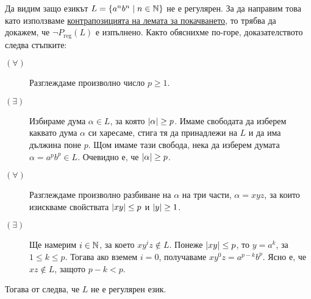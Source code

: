 \begin{example}\label{ex:regular:pumping:an-bn}
  Да видим защо езикът $L = \{a^nb^n \mid n\in \mathbb{N}\}$ не е регулярен.
  За да направим това като използваме \hyperref[cor:pumping-reg]{контрапозицията на лемата за покачването}, то трябва да докажем, че
  $\neg P_{\text{reg}}(L)$ е изпълнено.
  Както обяснихме по-горе, доказателството следва стъпките:
  \begin{description}
  \item[$(\forall)$]
    Разглеждаме произволно число $p \geq 1$.
  \item[$(\exists)$]
    Избираме дума $\alpha \in L$, за която $\lvert{\alpha}\rvert \geq p$. Имаме свободата да изберем каквато дума $\alpha$
    си харесаме, стига тя да принадлежи на $L$ и да има дължина поне $p$.
    Щом имаме тази свобода, нека да изберем думата $\alpha = a^pb^p \in L$.
    Очевидно е, че $\lvert{\alpha}\rvert \geq p$.
  \item[$(\forall)$]
    Разглеждаме произволно разбиване на $\alpha$ на три части, $\alpha = xyz$,
    за които изискваме свойствата $\lvert{xy}\rvert \leq p$ и $\lvert{y}\rvert \geq 1$.
  \item[$(\exists)$]
    Ще намерим $i\in\mathbb{N}$, за което $xy^iz \not\in L$.
    Понеже $\lvert{xy}\rvert \leq p$, то $y = a^k$, за  $1\leq k \leq p$.
    Тогава ако вземем $i = 0$, получаваме $xy^0z = a^{p-k}b^p$.
    Ясно е, че $xz \not\in L$, защото $p-k < p$.
  \end{description}  
  Тогава от  следва, че $L$ не е регулярен език.
\end{example}

